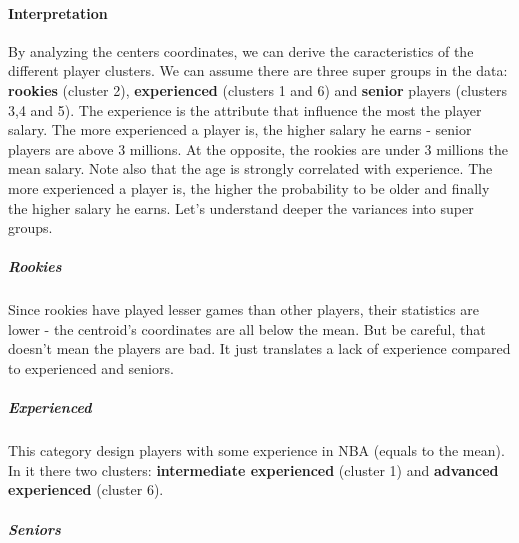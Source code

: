 \paragraph{Interpretation}By analyzing the centers coordinates, we can derive the caracteristics of the different player clusters. We can assume there are three super groups in the data: \textbf{rookies} (cluster 2), \textbf{experienced} (clusters 1 and 6) and \textbf{senior} players (clusters 3,4 and 5). The experience is the attribute that influence the most the player salary. The more experienced a player is, the higher salary he earns - senior players are above $3$ millions. At the opposite, the rookies are under $3$ millions the mean salary. Note also that the age is strongly correlated with experience. The more experienced a player is, the higher the probability to be older and finally the higher salary he earns. Let's understand deeper the variances into super groups.

\subparagraph{Rookies}Since rookies have played lesser games than other players, their statistics are lower - the centroid's coordinates are all below the mean. But be careful, that doesn't mean the players are bad. It just translates a lack of experience compared to experienced and seniors.

\subparagraph{Experienced}This category design players with some experience in NBA (equals to the mean). In it there two clusters: \textbf{intermediate experienced} (cluster 1) and \textbf{advanced experienced} (cluster 6). 

\subparagraph{Seniors}
